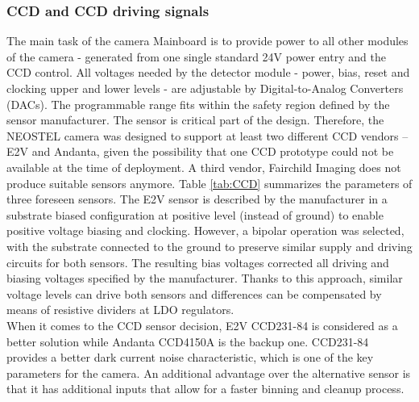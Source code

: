 \subsubsection{CCD and CCD driving signals}
The main task of the camera Mainboard is to provide power to all other modules of the camera - generated from one single standard 24V power entry and the CCD control.  All voltages needed by the detector module - power, bias, reset and clocking upper and lower levels - are adjustable by Digital-to-Analog Converters (DACs). The programmable range fits within the safety region defined by the sensor manufacturer.
The sensor is critical part of the design. Therefore, the NEOSTEL camera was designed to support at least two different CCD vendors – E2V and Andanta, given the possibility that one CCD prototype could not be available at the time of deployment. A third vendor, Fairchild Imaging does not produce suitable sensors anymore. Table \ref{tab:CCD} summarizes the parameters of three foreseen sensors.
The E2V sensor is described by the manufacturer in a substrate biased configuration at positive level (instead of ground) to enable positive voltage biasing and clocking. However, a bipolar operation was selected, with the substrate connected to the ground to preserve similar supply and driving circuits for both sensors. The resulting bias voltages corrected all driving and biasing voltages specified by the manufacturer. Thanks to this approach, similar voltage levels can drive both sensors and differences can be compensated by means of resistive dividers at LDO regulators. \\
When it comes to the CCD sensor decision, E2V CCD231-84 is considered as a better solution while Andanta CCD4150A is the backup one. CCD231-84 provides a better dark current noise characteristic, which is one of the key parameters for the camera. An additional advantage over the alternative sensor is that it has additional inputs that allow for a faster binning and cleanup process.

